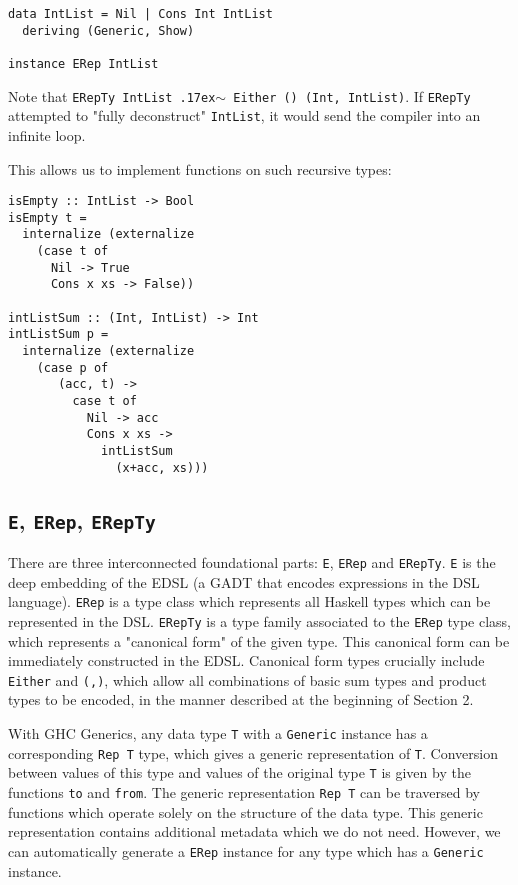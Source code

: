 \documentclass[sigplan,anonymous,review]{acmart}
\newcommand{\typeeq}{\raise.17ex\hbox{$\scriptstyle\mathtt{\sim}$}\,\;}
\newcommand{\ttt}{\texttt}
\begin{document}
\begin{lstlisting}
data IntList = Nil | Cons Int IntList
  deriving (Generic, Show)

instance ERep IntList
\end{lstlisting}

Note that \ttt{ERepTy IntList \typeeq Either () (Int, IntList)}. If \ttt{ERepTy}
attempted to "fully deconstruct" \ttt{IntList}, it would send the compiler
into an infinite loop.

This allows us to implement functions on such recursive types:

\begin{lstlisting}
isEmpty :: IntList -> Bool
isEmpty t =
  internalize (externalize
    (case t of
      Nil -> True
      Cons x xs -> False))

intListSum :: (Int, IntList) -> Int
intListSum p =
  internalize (externalize
    (case p of
       (acc, t) ->
         case t of
           Nil -> acc
           Cons x xs ->
             intListSum
               (x+acc, xs)))
\end{lstlisting}

\subsection{\ttt{E}, \ttt{ERep}, \ttt{ERepTy}}

There are three interconnected foundational parts: \ttt{E}, \ttt{ERep} and
\ttt{ERepTy}. \ttt{E} is the deep embedding of the EDSL (a GADT that encodes
expressions in the DSL language). \ttt{ERep} is a type class which represents
all Haskell types which can be represented in the DSL. \ttt{ERepTy} is a type
family associated to the \ttt{ERep} type class, which represents a "canonical form"
of the given type. This canonical form can be immediately constructed in the EDSL.
Canonical form types crucially include \ttt{Either} and \ttt{(,)}, which
allow all combinations of basic sum types and product types to be encoded, in the
manner described at the beginning of Section 2.

With GHC Generics, any data type \ttt{T} with a \ttt{Generic} instance has a
corresponding \ttt{Rep T} type, which gives a generic representation of \ttt{T}.
Conversion between values of this type and values of the original type \ttt{T} is
given by the functions \ttt{to} and \ttt{from}. The generic representation \ttt{Rep T}
can be traversed by functions which operate solely on the structure of the data type.
This generic representation contains additional metadata which we do not need.
However, we can automatically generate a \ttt{ERep} instance for any type which
has a \ttt{Generic} instance.
\end{document}
